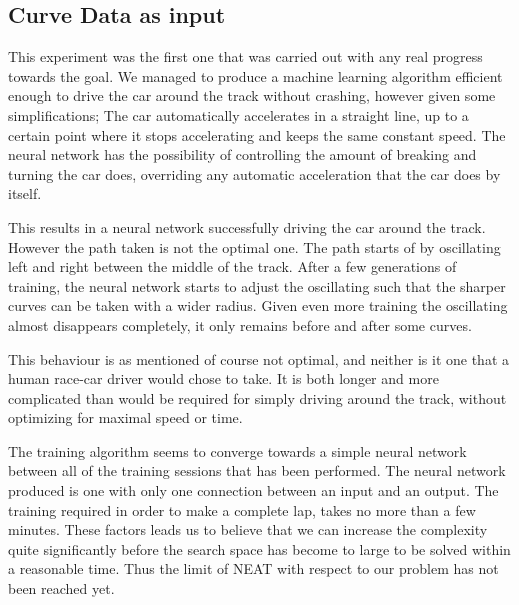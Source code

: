 \subsection{Curve Data as input}
This experiment was the first one that was carried out with any real progress towards the goal. We managed to produce a machine learning algorithm efficient enough to drive the car around the track without crashing, however given some simplifications; The car automatically accelerates in a straight line, up to a certain point where it stops accelerating and keeps the same constant speed. The neural network has the possibility of controlling the amount of breaking and turning the car does, overriding any automatic acceleration that the car does by itself.

This results in a neural network successfully driving the car around the track. However the path taken is not the optimal one. The path starts of by oscillating left and right between the middle of the track. After a few generations of training, the neural network starts to adjust the oscillating such that the sharper curves can be taken with a wider radius. Given even more training the oscillating almost disappears completely, it only remains before and after some curves.

This behaviour is as mentioned of course not optimal, and neither is it one that a human race-car driver would chose to take. It is both longer and more complicated than would be required for simply driving around the track, without optimizing for maximal speed or time.

The training algorithm seems to converge towards a simple neural network between all of the training sessions that has been performed. The neural network produced is one with only one connection between an input and an output. The training required in order to make a complete lap, takes no more than a few minutes. These factors leads us to believe that we can increase the complexity quite significantly before the search space has become to large to be solved within a reasonable time. Thus the limit of NEAT with respect to our problem has not been reached yet.


